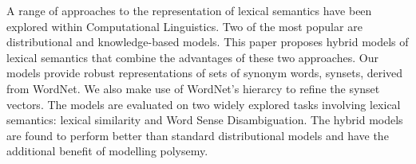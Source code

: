 A range of approaches to the representation of lexical semantics have been explored within Computational Linguistics. Two of the most popular are distributional and knowledge-based models. This paper proposes hybrid models of lexical semantics that combine the advantages of these two approaches. Our models provide robust representations of sets of synonym words, synsets, derived from WordNet. We also make use of WordNet's hierarcy to refine the synset vectors. The models are evaluated on two widely explored tasks involving lexical semantics: lexical similarity and Word Sense Disambiguation. The hybrid models are found to perform better than standard distributional models and have the additional benefit of modelling polysemy.
